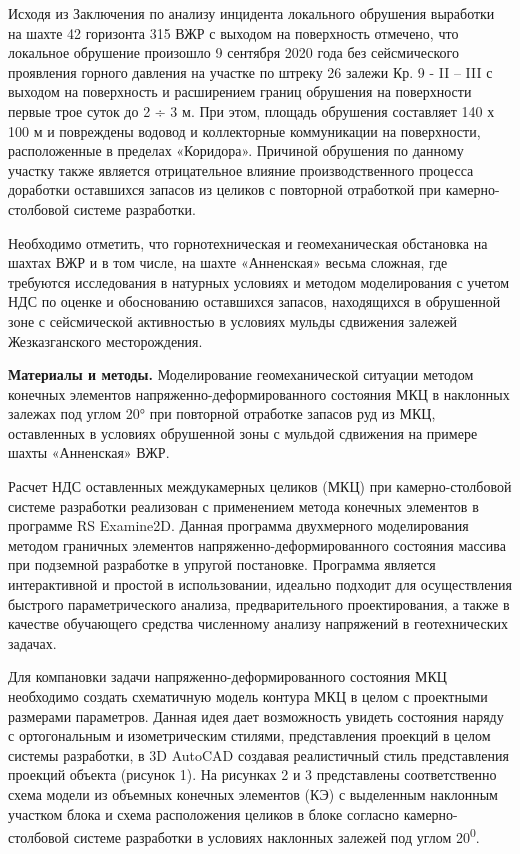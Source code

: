 Исходя из Заключения по анализу инцидента локального обрушения выработки
на шахте 42 горизонта 315 ВЖР с выходом на поверхность отмечено, что
локальное обрушение произошло 9 сентября 2020 года без сейсмического
проявления горного давления на участке по штреку 26 залежи Кр. 9 - II --
III с выходом на поверхность и расширением границ обрушения на
поверхности первые трое суток до 2 ÷ 3 м. При этом, площадь обрушения
составляет 140 х 100 м и повреждены водовод и коллекторные коммуникации
на поверхности, расположенные в пределах «Коридора». Причиной обрушения
по данному участку также является отрицательное влияние
производственного процесса доработки оставшихся запасов из целиков с
повторной отработкой при камерно-столбовой системе разработки.

Необходимо отметить, что горнотехническая и геомеханическая обстановка
на шахтах ВЖР и в том числе, на шахте «Анненская» весьма сложная, где
требуются исследования в натурных условиях и методом моделирования с
учетом НДС по оценке и обоснованию оставшихся запасов, находящихся в
обрушенной зоне с сейсмической активностью в условиях мульды сдвижения
залежей Жезказганского месторождения.

{\bfseries Материалы и методы.} Моделирование геомеханической ситуации
методом конечных элементов напряженно-деформированного состояния МКЦ в
наклонных залежах под углом 20° при повторной отработке запасов руд из
МКЦ, оставленных в условиях обрушенной зоны с мульдой сдвижения на
примере шахты «Анненская» ВЖР.

Расчет НДС оставленных междукамерных целиков (МКЦ) при камерно-столбовой
системе разработки реализован с применением метода конечных элементов в
программе RS Examine2D. Данная программа двухмерного моделирования
методом граничных элементов напряженно-деформированного состояния
массива при подземной разработке в упругой постановке. Программа
является интерактивной и простой в использовании, идеально подходит для
осуществления быстрого параметрического анализа, предварительного
проектирования, а также в качестве обучающего средства численному
анализу напряжений в геотехнических задачах.

Для компановки задачи напряженно-деформированного состояния МКЦ
необходимо создать схематичную модель контура МКЦ в целом с проектными
размерами параметров. Данная идея дает возможность увидеть состояния
наряду с ортогональным и изометрическим стилями, представления проекций
в целом системы разработки, в 3D AutoCAD создавая реалистичный стиль
представления проекций объекта (рисунок 1). На рисунках 2 и 3
представлены соответственно схема модели из объемных конечных элементов
(КЭ) с выделенным наклонным участком блока и схема расположения целиков
в блоке согласно камерно-столбовой системе разработки в условиях
наклонных залежей под углом 20\textsuperscript{0}.

